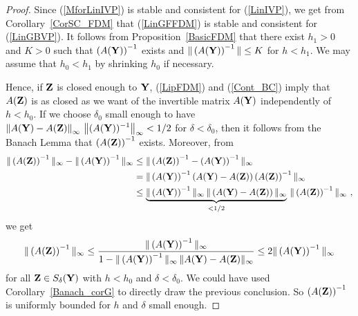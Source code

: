 
\begin{proof}
Since (\ref{MforLinIVP}) is stable and consistent for (\ref{LinIVP}),
we get from Corollary~\ref{CorSC_FDM} that
(\ref{LinGFFDM}) is stable and consistent for (\ref{LinGBVP}).
It follows from
Proposition~\ref{BasicFDM} that there exist $h_1 >0$ and $K>0$ such
that $\displaystyle \left(A(\mathbf{Y})\right)^{-1}$ exists and
$\displaystyle \| \left(A(\mathbf{Y})\right)^{-1} \| \leq K$ for
$h < h_1$.  We may assume that $h_0 < h_1$ by shrinking $h_0$ if
necessary.

Hence, if $\mathbf{Z}$ is closed enough to $\mathbf{Y}$, (\ref{LipFDM}) and
(\ref{Cont_BC}) imply that 
$A(\mathbf{Z})$ is as closed as we want of the invertible matrix
$A(\mathbf{Y})$ independently of $h < h_0$.  If we choose $\delta_0$
small enough to have
$\displaystyle \left\|A(\mathbf{Y}) - A(\mathbf{Z})\right\|_\infty
\, \left\| (A(\mathbf{Y}))^{-1}\right\|_\infty < 1/2$ for $\delta < \delta_0$,
then it follows from the Banach Lemma
that $\displaystyle \left(A(\mathbf{Z})\right)^{-1}$ exists.  Moreover, from
\begin{align*}
\| \left(A(\mathbf{Z})\right)^{-1}\|_\infty
- \|\left(A(\mathbf{Y})\right)^{-1}\|_\infty
& \leq \| \left(A(\mathbf{Z})\right)^{-1} - \left(A(\mathbf{Y})\right)^{-1}\|_\infty
\\
&= \| \left(A(\mathbf{Y})\right)^{-1}
\left( A(\mathbf{Y}) - A(\mathbf{Z}) \right)
\left(A(\mathbf{Z})\right)^{-1}\|_\infty \\
& \leq \underbrace{\| \left(A(\mathbf{Y})\right)^{-1} \|_\infty \,
\|\left( A(\mathbf{Y}) - A(\mathbf{Z}) \right)\|_\infty}_{<1/2} \,
\|\left(A(\mathbf{Z})\right)^{-1}\|_\infty \ ,
\end{align*}
we get
\[
\| \left(A(\mathbf{Z})\right)^{-1} \|_\infty \leq
\frac{\|\left(A(\mathbf{Y})\right)^{-1}\|_\infty}
{1-\|\left(A(\mathbf{Y})\right)^{-1}\|_\infty\,
\|A(\mathbf{Y})- A(\mathbf{Z})\|_\infty}
\leq 2 \|\left(A(\mathbf{Y})\right)^{-1}\|_\infty
\]
for all $\mathbf{Z} \in S_\delta(\mathbf{Y})$ with $h < h_0$ and
$\delta < \delta_0$.  We could have used Corollary~\ref{Banach_corG}
to directly draw the previous conclusion.  So
$\displaystyle \left(A(\mathbf{Z})\right)^{-1}$
is uniformly bounded for $h$ and $\delta$ small enough.


\end{proof}
